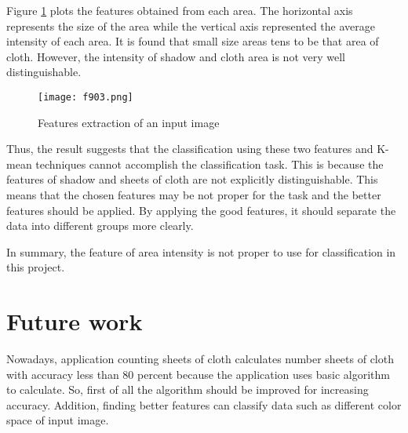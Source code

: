 Figure \ref{fig:f903} plots the features obtained from each area. The horizontal axis represents the size of the area while the vertical axis represented the average intensity of each area. It is found that small size areas tens to be that area of cloth. However, the intensity of shadow and cloth area is not very well distinguishable.
\begin{figure}[t]
	\centering
	\texttt{[image: f903.png]}
	\caption{Features extraction of an input image}
	\label{fig:f903}
\end{figure} 

Thus, the result suggests that the classification using these two features and K-mean techniques cannot accomplish the classification task. This is because the features of shadow and sheets of cloth are not explicitly distinguishable. This means that the chosen features may be not proper for the task and the better features should be applied. By applying the good features, it should separate the data into different groups more clearly.

In summary, the feature of area intensity is not proper to use for classification in this project.
\section{Future work}
Nowadays, application counting sheets of cloth calculates number sheets of cloth with accuracy less than 80 percent because the application uses basic algorithm to calculate. So, first of all the algorithm should be improved for increasing accuracy. Addition, finding better features can classify data such as different color space of input image.